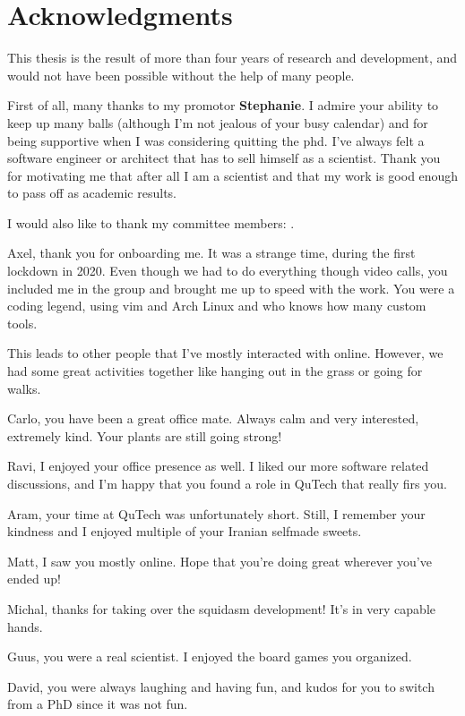 \chapter*{Acknowledgments}

This thesis is the result of more than four years of research and development, and would not have been possible without the help of many people.

First of all, many thanks to my promotor \textbf{Stephanie}.
I admire your ability to keep up many balls (although I'm not jealous of your busy calendar) and for being supportive when I was considering quitting the phd.
I've always felt a software engineer or architect that has to sell himself as a scientist.
Thank you for motivating me that after all I am a scientist and that my work is good enough to pass off as academic results.

I would also like to thank my committee members: .

Axel, thank you for onboarding me. It was a strange time, during the first lockdown in 2020. Even though we had to do everything though video calls, you included me in the group and brought me up to speed with the work. You were a coding legend, using vim and Arch Linux and who knows how many custom tools.

This leads to other people that I've mostly interacted with online.
However, we had some great activities together like hanging out in the grass or going for walks.

Carlo, you have been a great office mate. Always calm and very interested, extremely kind. Your plants are still going strong!

Ravi, I enjoyed your office presence as well. I liked our more software related discussions, and I'm happy that you found a role in QuTech that really firs you.

Aram, your time at QuTech was unfortunately short. Still, I remember your kindness and I enjoyed multiple of your Iranian selfmade sweets.

Matt, I saw you mostly online. Hope that you're doing great wherever you've ended up!

Michal, thanks for taking over the squidasm development! It's in very capable hands.

Guus, you were a real scientist. I enjoyed the board games you organized.

David, you were always laughing and having fun, and kudos for you to switch from a PhD since it was not fun.

